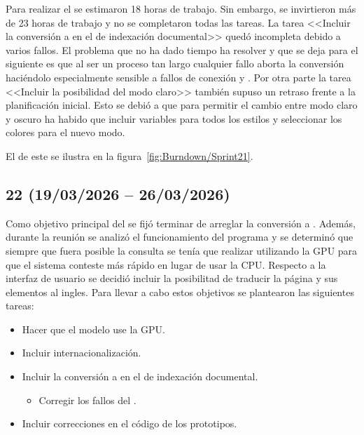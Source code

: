Para realizar el  se estimaron 18 horas de trabajo. Sin embargo, se invirtieron más de 23 horas de trabajo y no se completaron todas las tareas. La tarea <<Incluir la conversión a  en el  de indexación documental>> quedó incompleta debido a varios fallos. El problema que no ha dado tiempo ha resolver y que se deja para el  siguiente es que al ser un proceso tan largo cualquier fallo aborta la conversión haciéndolo especialmente sensible a fallos de conexión y . Por otra parte la tarea <<Incluir la posibilidad del modo claro>> también supuso un retraso frente a la planificación inicial. Esto se debió a que para permitir el cambio entre modo claro y oscuro ha habido que incluir variables para todos los estilos y seleccionar los colores para el nuevo modo.

El  de este  se ilustra en la figura~\ref{fig:Burndown/Sprint21}.

\subsection{ 22 (19/03/2026 -- 26/03/2026)}
Como objetivo principal del  se fijó terminar de arreglar la conversión a . Además, durante la reunión se analizó el funcionamiento del programa y se determinó que siempre que fuera posible la consulta se tenía que realizar utilizando la GPU para que el sistema conteste más rápido en lugar de usar la CPU. Respecto a la interfaz de usuario se decidió incluir la posibilitad de traducir la página y sus elementos al ingles. Para llevar a cabo estos objetivos se plantearon las siguientes tareas:

\begin{itemize}
\tightlist
	\item Hacer que el modelo use la GPU.
	\item Incluir internacionalización.
	\item Incluir la conversión a  en el  de indexación documental.
	\begin{itemize}
	\tightlist
		\item Corregir los fallos del .
	\end{itemize}
	\item Incluir correcciones en el código de los prototipos.
\end{itemize}

